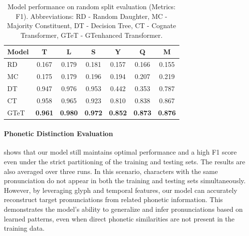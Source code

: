 \begin{table}[ht]
    \centering
    \footnotesize
    \begin{tabular}{l@{\hskip 10pt}c@{\hskip 10pt}c@{\hskip 10pt}c@{\hskip 10pt}c@{\hskip 10pt}c@{\hskip 10pt}c}
    \hline
    \textbf{Model} & \textbf{T} & \textbf{L} & \textbf{S} & \textbf{Y} & \textbf{Q} & \textbf{M}\\
    \hline
    RD & 0.167 & 0.179 & 0.181 & 0.157 & 0.166 & 0.155\\
    MC & 0.175 & 0.179 & 0.196 & 0.194 & 0.207 & 0.219\\
    \hline
    DT & 0.947 & 0.976 & 0.953 & 0.442 & 0.353 & 0.787\\
    CT & 0.958 & 0.965 & 0.923 & 0.810 & 0.838 & 0.867\\
    GTeT & \textbf{0.961} & \textbf{0.980} & \textbf{0.972} & \textbf{0.852} & \textbf{0.873} & \textbf{0.876}\\
    \hline
    \end{tabular}
    \caption{Model performance on random split evaluation (Metrics: F1). Abbreviations: RD - Random Daughter, MC - Majority Constituent, DT - Decision Tree, CT - Cognate Transformer, GTeT - GTenhanced Transformer.}
    \label{tab:random split}
\end{table}

\paragraph{Phonetic Distinction Evaluation}

 shows that our model still maintains optimal performance and a high F1 score even under the strict partitioning of the training and testing sets. The results are also averaged over three runs. In this scenario, characters with the same pronunciation do not appear in both the training and testing sets simultaneously. However, by leveraging glyph and temporal features, our model can accurately reconstruct target pronunciations from related phonetic information. This demonstrates the model's ability to generalize and infer pronunciations based on learned patterns, even when direct phonetic similarities are not present in the training data.

